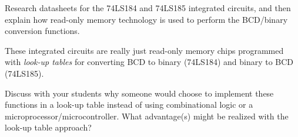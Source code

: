 

Research datasheets for the 74LS184 and 74LS185 integrated circuits, and then explain how read-only memory technology is used to perform the BCD/binary conversion functions.







These integrated circuits are really just read-only memory chips programmed with {\it look-up tables} for converting BCD to binary (74LS184) and binary to BCD (74LS185).







Discuss with your students why someone would choose to implement these functions in a look-up table instead of using combinational logic or a microprocessor/microcontroller.  What advantage(s) might be realized with the look-up table approach?




